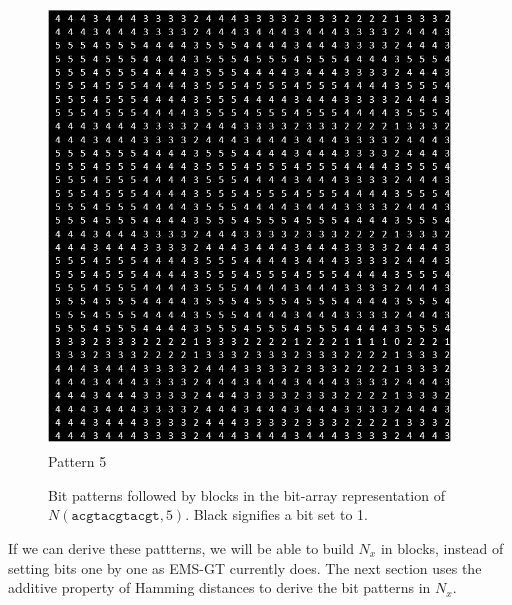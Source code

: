 \documentclass[oneside,12pt]{DISCSthesis}
\begin{document}
\begin{figure}[h]
			\begin{minipage}{.135\textwidth}\centering\includegraphics[width=0.95\textwidth]{img/5}\\ Pattern 5 \end{minipage}
			\newline\newline
			\caption{Bit patterns followed by blocks in the bit-array representation of $N(\texttt{acgtacgtacgt}, 5)$. 
			Black signifies a bit set to 1.}
			\end{figure}

		\noindent If we can derive these pattterns, we will be able to build $N_x$ in blocks, instead of setting bits one by one as EMS-GT currently does. The next section uses the additive property of Hamming distances to derive the bit patterns in $N_x$.
		\newpage
\end{document}

